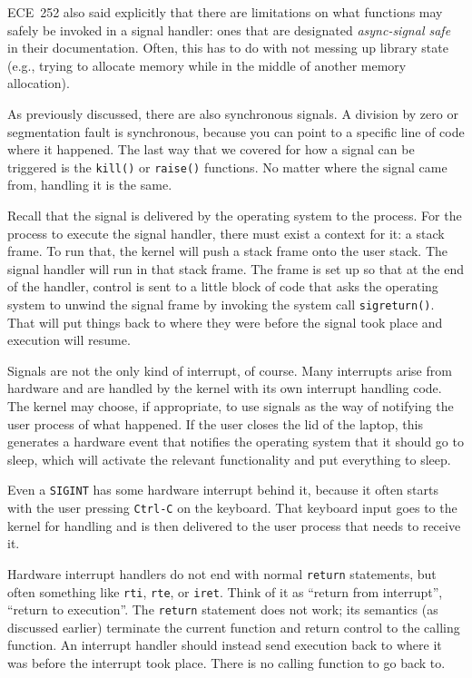 ECE~252 also said explicitly that there are limitations on what functions may safely be invoked in a signal handler: ones that are designated \textit{async-signal safe} in their documentation. Often, this has to do with not messing up library state (e.g., trying to allocate memory while in the middle of another memory allocation).

As previously discussed, there are also synchronous signals. A division by zero or segmentation fault is synchronous, because you can point to a specific line of code where it happened. The last way that we covered for how a signal can be triggered is the \texttt{kill()} or \texttt{raise()} functions. No matter where the signal came from, handling it is the same.

Recall that the signal is delivered by the operating system to the process. For the process to execute the signal handler, there must exist a context for it: a stack frame. To run that, the kernel will push a stack frame onto the user stack. The signal handler will run in that stack frame. The frame is set up so that at the end of the handler, control is sent to a little block of code that asks the operating system to unwind the signal frame by invoking the system call \texttt{sigreturn()}. That will put things back to where they were before the signal took place and execution will resume.

Signals are not the only kind of interrupt, of course. Many interrupts arise from hardware and are handled by the kernel with its own interrupt handling code. The kernel may choose, if appropriate, to use signals as the way of notifying the user process of what happened. If the user closes the lid of the laptop, this generates a hardware event that notifies the operating system that it should go to sleep, which will activate the relevant functionality and put everything to sleep.

Even a \texttt{SIGINT} has some hardware interrupt behind it, because it often starts with the user pressing \texttt{Ctrl-C} on the keyboard. That keyboard input goes to the kernel for handling and is then delivered to the user process that needs to receive it. 

Hardware interrupt handlers do not end with normal \texttt{return} statements, but often something like \texttt{rti}, \texttt{rte}, or \texttt{iret}. Think of it as ``return from interrupt'', ``return to execution''. The \texttt{return} statement does not work; its semantics (as discussed earlier) terminate the current function and return control to the calling function. An interrupt handler should instead send execution back to where it was before the interrupt took place. There is no calling function to go back to.  

